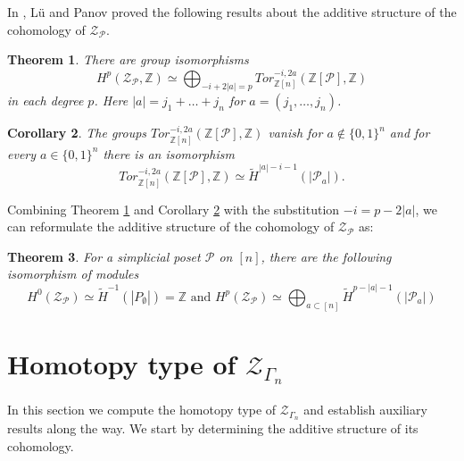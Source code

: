 \documentclass[a4paper,11pt]{article}
\newtheorem{theorem}{Theorem}[section]
\newtheorem{corollary}[theorem]{Corollary}
\theoremstyle{definition}
\newcommand{\Z}{\mathbb{Z}}
\newcommand{\PP}{\mathcal{P}}
\newcommand{\ZZ}{\mathcal{Z}}
\begin{document}
In \cite{lue-panov}, L\"u and Panov proved the following results about the additive structure of the cohomology of $\ZZ_\PP$.

\begin{theorem}\cite[Theorem~3.5]{lue-panov} \label{theo1-lue-panov}
    There are group isomorphisms
    \[
    H^p(\ZZ_\PP,\Z) \simeq \bigoplus_{-i + 2|a| = p} Tor^{-i,2a}_{\Z[n]}(\Z[\PP],\Z)
    \]
    in each degree $p$. Here $|a| = j_1 + \ldots + j_n$ for $a = (j_1, \ldots, j_n)$. 
\end{theorem}

 \begin{corollary}
     \cite[Corollary~3.9,3.10]{lue-panov} \label{cor1-lue-panov}
    The groups $Tor^{-i,2a}_{\Z[n]}(\Z[\PP],\Z)$ vanish for $a \not\in \{0,1\}^n$ and for every $a \in \{0,1\}^n$ there is an isomorphism 
    \[
    Tor^{-i,2a}_{\Z[n]}(\Z[\PP],\Z) \simeq \tilde{H}^{|a| - i - 1}(|\PP_a|).
    \]
\end{corollary}

Combining Theorem \ref{theo1-lue-panov} and Corollary \ref{cor1-lue-panov} with the substitution $-i = p - 2|a|$, we can reformulate the additive structure of the cohomology of $\ZZ_\PP$ as: 
 \begin{theorem}\label{lue-panov}
    For a simplicial poset $\PP$ on $[n]$, there are the following isomorphism of modules \[ H^0(\ZZ_\PP) \simeq \tilde{H}^{-1}(|P_\emptyset|) = \Z \text{ and } H^p(\ZZ_\PP) \simeq \bigoplus_{a \subset [n]} \tilde{H}^{p - |a| - 1}(|\PP_a|)\]
 \end{theorem}


\section{Homotopy type of $\ZZ_{\Gamma_n}$}\label{sec-homoto-type}

In this section we compute the homotopy type of $\ZZ_{\Gamma_n}$ and establish auxiliary results along the way. We start by determining the additive structure of its cohomology.
\end{document}
